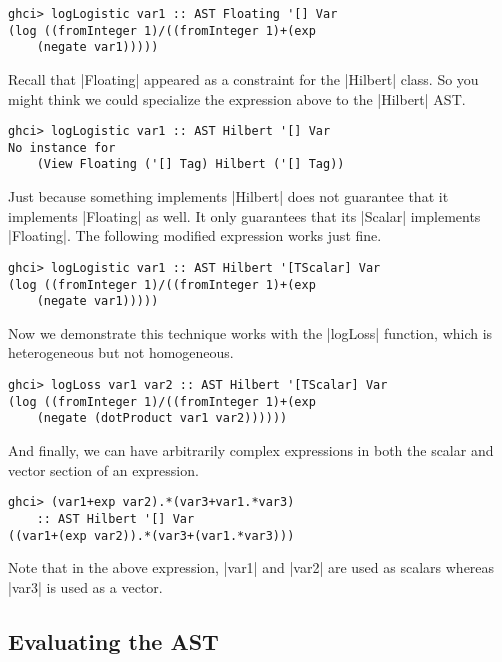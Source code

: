 \documentclass[preprint]{sigplanconf}
\theoremstyle{definition}
\begin{document}
\begin{lstlisting}
ghci> logLogistic var1 :: AST Floating '[] Var
(log ((fromInteger 1)/((fromInteger 1)+(exp
    (negate var1)))))
\end{lstlisting}
Recall that |Floating| appeared as a constraint for the |Hilbert| class.
So you might think we could specialize the expression above to the |Hilbert| AST.
\begin{lstlisting}
ghci> logLogistic var1 :: AST Hilbert '[] Var
No instance for
    (View Floating ('[] Tag) Hilbert ('[] Tag))
\end{lstlisting}
Just because something implements |Hilbert| does not guarantee that it implements |Floating| as well.
It only guarantees that its |Scalar| implements |Floating|.
The following modified expression works just fine.
\begin{lstlisting}
ghci> logLogistic var1 :: AST Hilbert '[TScalar] Var
(log ((fromInteger 1)/((fromInteger 1)+(exp
    (negate var1)))))
\end{lstlisting}
Now we demonstrate this technique works with the |logLoss| function,
which is heterogeneous but not homogeneous.
\begin{lstlisting}
ghci> logLoss var1 var2 :: AST Hilbert '[TScalar] Var
(log ((fromInteger 1)/((fromInteger 1)+(exp
    (negate (dotProduct var1 var2))))))
\end{lstlisting}
And finally, we can have arbitrarily complex expressions in both the scalar and vector section of an expression.
\begin{lstlisting}
ghci> (var1+exp var2).*(var3+var1.*var3)
    :: AST Hilbert '[] Var
((var1+(exp var2)).*(var3+(var1.*var3)))
\end{lstlisting}
Note that in the above expression, |var1| and |var2| are used as scalars whereas |var3| is used as a vector.
\subsection{Evaluating the AST}
\label{sec:het.eval}
\end{document}
